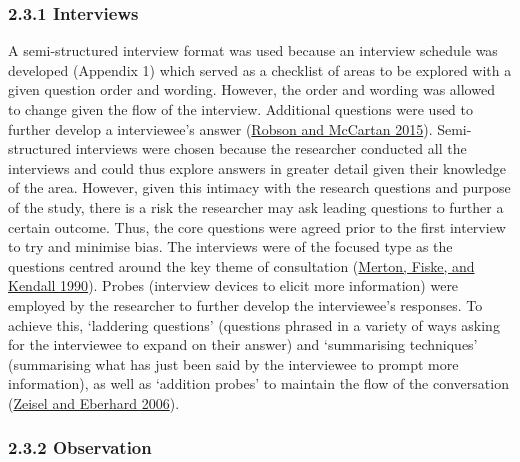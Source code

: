 \documentclass[
]{article}
\begin{document}
\hypertarget{interviews}{%
\subsubsection{2.3.1 Interviews}\label{interviews}}

A semi-structured interview format was used because an interview
schedule was developed (Appendix 1) which served as a checklist of areas
to be explored with a given question order and wording. However, the
order and wording was allowed to change given the flow of the interview.
Additional questions were used to further develop a interviewee's answer
(\protect\hyperlink{ref-robsonRealWorldResearch2015}{Robson and McCartan
2015}). Semi-structured interviews were chosen because the researcher
conducted all the interviews and could thus explore answers in greater
detail given their knowledge of the area. However, given this intimacy
with the research questions and purpose of the study, there is a risk
the researcher may ask leading questions to further a certain outcome.
Thus, the core questions were agreed prior to the first interview to try
and minimise bias. The interviews were of the focused type as the
questions centred around the key theme of consultation
(\protect\hyperlink{ref-mertonFocusedInterviewManual1990}{Merton, Fiske,
and Kendall 1990}). Probes (interview devices to elicit more
information) were employed by the researcher to further develop the
interviewee's responses. To achieve this, `laddering questions'
(questions phrased in a variety of ways asking for the interviewee to
expand on their answer) and `summarising techniques' (summarising what
has just been said by the interviewee to prompt more information), as
well as `addition probes' to maintain the flow of the conversation
(\protect\hyperlink{ref-zeiselInquiryDesignEnvironment2006}{Zeisel and
Eberhard 2006}).

\hypertarget{observation}{%
\subsubsection{2.3.2 Observation}\label{observation}}
\end{document}
